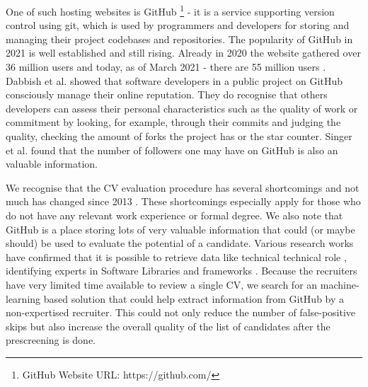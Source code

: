 One of such hosting websites is GitHub \footnote{GitHub Website URL: https://github.com/} - it is a service supporting version control using git, which is used by programmers and developers for storing and managing their project codebases and repositories. The popularity of GitHub in 2021 is well established and still rising. Already in 2020 the website gathered over 36 million users \cite{GitHubUsers2020} and today, as of March 2021 - there are 55 million users \cite{GitHubUsers2021}. Dabbish et al. \cite{DabbishC} showed that software developers in a public project on GitHub consciously manage their online reputation. They do recognise that others developers can assess their personal characteristics such as the quality of work or commitment by looking, for example, through their commits and judging the quality, checking the amount of forks the project has or the star counter. Singer et al. \cite{Singer} found that the number of followers one may have on GitHub is also an valuable information.

We recognise that the CV evaluation procedure has several shortcomings and not much has changed since 2013 \cite{Capiluppi}. These shortcomings especially apply for those who do not have any relevant work experience or formal degree. We also note that GitHub is a place storing lots of very valuable information that could (or maybe should) be used to evaluate the potential of a candidate. Various research works have confirmed that it is possible to retrieve data like technical technical role \cite{TechnicalRole}, identifying experts in Software Libraries and frameworks \cite{SoftwareLibraries}. Because the recruiters have very limited time available to review a single CV, we search for an machine-learning based solution that could help extract information from GitHub by a non-expertised recruiter. This could not only reduce the number of false-positive skips but also increase the overall quality of the list of candidates after the prescreening is done.
